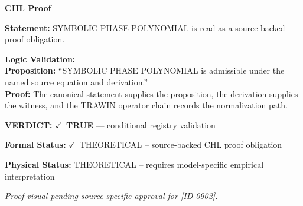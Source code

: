 \vspace{0.45em}
\noindent\textbf{CHL Proof}\par
\textbf{Statement:} SYMBOLIC PHASE POLYNOMIAL is read as a source-backed proof obligation.

\textbf{Logic Validation:}\\
\textbf{Proposition:} ``SYMBOLIC PHASE POLYNOMIAL is admissible under the named source equation and derivation.''\\
\textbf{Proof:} The canonical statement supplies the proposition, the derivation supplies the witness, and the TRAWIN operator chain records the normalization path.

\textbf{VERDICT:} \ensuremath{\checkmark}\ \textbf{TRUE} --- conditional registry validation

\textbf{Formal Status:} \ensuremath{\checkmark}\ THEORETICAL -- source-backed CHL proof obligation

\textbf{Physical Status:} THEORETICAL -- requires model-specific empirical interpretation
\par\vspace{0.45em}
\par
\vfill
\begingroup\footnotesize\itshape
Proof visual pending source-specific approval for [ID 0902].
\par\endgroup
\vfill
\endgroup
\endgroup
